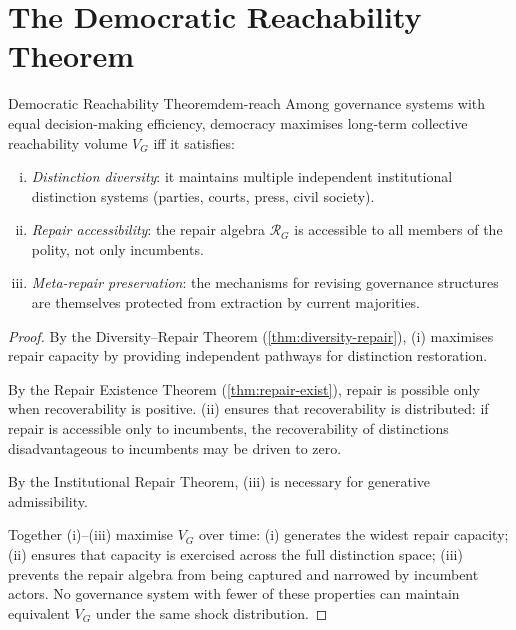\documentclass[12pt,twoside,openright]{book}
\newcounter{exercise}[chapter]
\begin{document}
\section{The Democratic Reachability Theorem}

\begin{theorem}{Democratic Reachability Theorem}{dem-reach}
  Among governance systems with equal decision-making
  efficiency, democracy maximises long-term collective
  reachability volume $V_G$ iff it satisfies:
  \begin{enumerate}[(i)]
    \item \emph{Distinction diversity}: it maintains
          multiple independent institutional distinction
          systems (parties, courts, press, civil society).
    \item \emph{Repair accessibility}: the repair
          algebra $\mathcal{R}_G$ is accessible to
          all members of the polity, not only incumbents.
    \item \emph{Meta-repair preservation}: the
          mechanisms for revising governance structures
          are themselves protected from extraction
          by current majorities.
  \end{enumerate}
\end{theorem}

\begin{proof}
  By the Diversity--Repair Theorem
  (\cref{thm:diversity-repair}), (i) maximises repair
  capacity by providing independent pathways for
  distinction restoration.

  By the Repair Existence Theorem
  (\cref{thm:repair-exist}), repair is possible only
  when recoverability is positive. (ii) ensures that
  recoverability is distributed: if repair is
  accessible only to incumbents, the recoverability of
  distinctions disadvantageous to incumbents may be
  driven to zero.

  By the Institutional Repair Theorem, (iii) is
  necessary for generative admissibility.

  Together (i)--(iii) maximise $V_G$ over time:
  (i) generates the widest repair capacity; (ii) ensures
  that capacity is exercised across the full distinction
  space; (iii) prevents the repair algebra from being
  captured and narrowed by incumbent actors.
  No governance system with fewer of these properties
  can maintain equivalent $V_G$ under the same
  shock distribution.
\end{proof}
\end{document}
